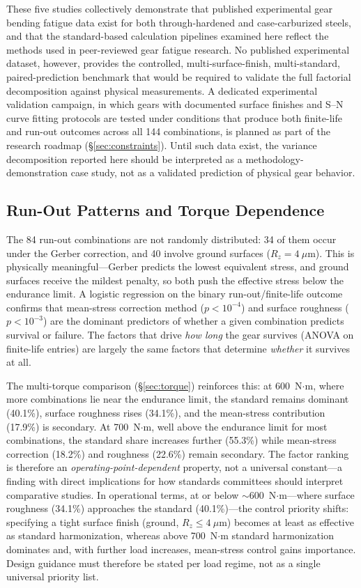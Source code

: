 \documentclass[twocolumn,12pt,a4paper]{article}
\begin{document}
These five studies collectively demonstrate that published experimental
gear bending fatigue data exist for both through-hardened and
case-carburized steels, and that the standard-based calculation
pipelines examined here reflect the methods used in peer-reviewed gear
fatigue research. No published experimental dataset, however, provides
the controlled, multi-surface-finish, multi-standard, paired-prediction
benchmark that would be required to validate the full factorial
decomposition against physical measurements. A dedicated experimental
validation campaign, in which gears with documented surface finishes
and S--N curve fitting protocols are tested under conditions that
produce both finite-life and run-out outcomes across all 144
combinations, is planned as part of the research roadmap
(\S\ref{sec:constraints}). Until such data exist, the variance
decomposition reported here should be interpreted as a
methodology-demonstration case study, not as a validated prediction of
physical gear behavior.

\subsection{Run-Out Patterns and Torque Dependence}

The 84 run-out combinations are not randomly distributed: 34 of them
occur under the Gerber correction, and 40 involve ground surfaces
($R_z = 4~\mu$m). This is physically meaningful---Gerber predicts the
lowest equivalent stress, and ground surfaces receive the mildest
penalty, so both push the effective stress below the endurance limit.
A logistic regression on the binary run-out/finite-life outcome
confirms that mean-stress correction method ($p < 10^{-4}$) and
surface roughness ($p < 10^{-3}$) are the dominant predictors of
whether a given combination predicts survival or failure. The factors
that drive \emph{how long} the gear survives (ANOVA on finite-life
entries) are largely the same factors that determine \emph{whether} it
survives at all.

The multi-torque comparison (\S\ref{sec:torque}) reinforces this:
at 600~N$\cdot$m, where more combinations lie near the endurance
limit, the standard remains dominant (40.1\%), surface roughness rises
(34.1\%), and the mean-stress contribution (17.9\%) is secondary. At
700~N$\cdot$m, well above the endurance limit for most combinations,
the standard share increases further (55.3\%) while mean-stress
correction (18.2\%) and roughness (22.6\%) remain secondary. The
factor ranking is therefore an
\emph{operating-point-dependent}
property, not a universal constant---a finding with direct implications
for how standards committees should interpret comparative studies. In
operational terms, at or below $\sim$600~N$\cdot$m---where surface
roughness (34.1\%) approaches the standard (40.1\%)---the control
priority shifts: specifying a tight surface finish (ground,
$R_z \leq 4~\mu$m) becomes at least as effective as standard
harmonization, whereas above 700~N$\cdot$m standard harmonization
dominates and, with further load increases, mean-stress control gains
importance. Design guidance must therefore be stated per load regime,
not as a single universal priority list.
\end{document}
